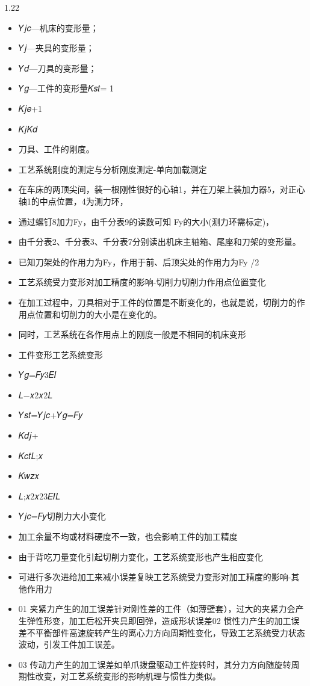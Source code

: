 \documentclass[12pt,a4paper]{article}
\begin{document}
\begin{spacing}{1.22}
\begin{itemize}[leftmargin=2.2em,label=--]
  \item 𝑌𝑗𝑐—机床的变形量；
  \item 𝑌𝑗—夹具的变形量；
  \item 𝑌𝑑—刀具的变形量；
  \item 𝑌𝑔—工件的变形量𝐾𝑠𝑡= 1
  \item 𝐾𝑗𝑒+1
  \item 𝐾𝑗𝐾𝑑
  \item 刀具、工件的刚度。
  \item 工艺系统刚度的测定与分析刚度测定-单向加载测定
  \item 在车床的两顶尖间，装一根刚性很好的心轴1，并在刀架上装加力器5，对正心轴1的中点位置，4为测力环，
  \item 通过螺钉8加力Fy，由千分表9的读数可知 Fy的大小(测力环需标定)，
  \item 由千分表2、千分表3、千分表7分别读出机床主轴箱、尾座和刀架的变形量。
  \item 已知刀架处的作用力为Fy，作用于前、后顶尖处的作用力为Fy /2
  \item 工艺系统受力变形对加工精度的影响-切削力切削力作用点位置变化
  \item 在加工过程中，刀具相对于工件的位置是不断变化的，也就是说，切削力的作用点位置和切削力的大小是在变化的。
  \item 同时，工艺系统在各作用点上的刚度一般是不相同的机床变形
  \item 工件变形工艺系统变形
  \item 𝑌𝑔=𝐹𝑦3𝐸𝐼
  \item 𝐿−𝑥2𝑥2𝐿
  \item 𝑌𝑠𝑡=𝑌𝑗𝑐+𝑌𝑔=𝐹𝑦
  \item 𝐾𝑑𝑗+
  \item 𝐾𝑐𝑡𝐿;𝑥
  \item 𝐾𝑤𝑧𝑥
  \item 𝐿;𝑥2𝑥23𝐸𝐼𝐿
  \item 𝑌𝑗𝑐=𝐹𝑦切削力大小变化
  \item 加工余量不均或材料硬度不一致，也会影响工件的加工精度
  \item 由于背吃刀量变化引起切削力变化，工艺系统变形也产生相应变化
  \item 可进行多次进给加工来减小误差复映工艺系统受力变形对加工精度的影响-其他作用力
  \item 01 夹紧力产生的加工误差针对刚性差的工件（如薄壁套），过大的夹紧力会产生弹性形变，加工后松开夹具即回弹，造成形状误差02 惯性力产生的加工误差不平衡部件高速旋转产生的离心力方向周期性变化，导致工艺系统受力状态波动，引发工件加工误差。
  \item 03 传动力产生的加工误差如单爪拨盘驱动工件旋转时，其分力方向随旋转周期性改变，对工艺系统变形的影响机理与惯性力类似。

\end{itemize}
\end{spacing}
\end{document}
